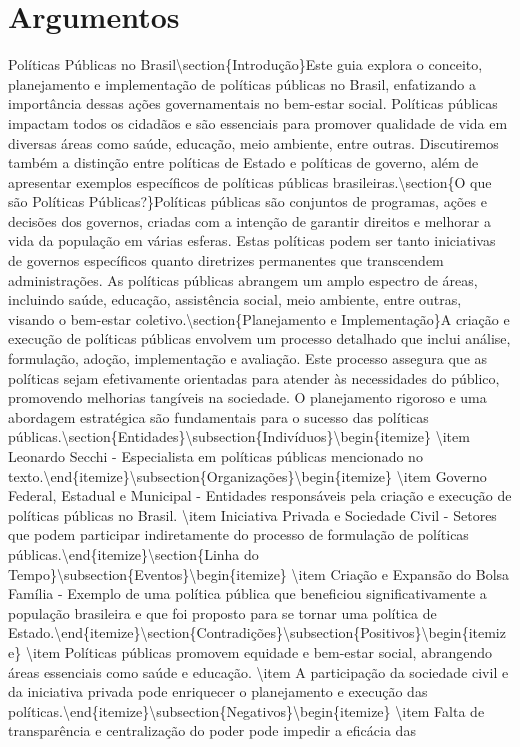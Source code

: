 \documentclass[
   article,       
   12pt,          
   oneside,       
   a4paper,       
   english,       
   brazil,        
   sumario=tradicional
   ]{abntex2}
\begin{document}
\section{Argumentos}
Políticas Públicas no Brasil\textbackslash{}section\{Introdução\}Este guia explora o conceito, planejamento e implementação de políticas públicas no Brasil, enfatizando a importância dessas ações governamentais no bem-estar social. Políticas públicas impactam todos os cidadãos e são essenciais para promover qualidade de vida em diversas áreas como saúde, educação, meio ambiente, entre outras. Discutiremos também a distinção entre políticas de Estado e políticas de governo, além de apresentar exemplos específicos de políticas públicas brasileiras.\textbackslash{}section\{O que são Políticas Públicas?\}Políticas públicas são conjuntos de programas, ações e decisões dos governos, criadas com a intenção de garantir direitos e melhorar a vida da população em várias esferas. Estas políticas podem ser tanto iniciativas de governos específicos quanto diretrizes permanentes que transcendem administrações. As políticas públicas abrangem um amplo espectro de áreas, incluindo saúde, educação, assistência social, meio ambiente, entre outras, visando o bem-estar coletivo.\textbackslash{}section\{Planejamento e Implementação\}A criação e execução de políticas públicas envolvem um processo detalhado que inclui análise, formulação, adoção, implementação e avaliação. Este processo assegura que as políticas sejam efetivamente orientadas para atender às necessidades do público, promovendo melhorias tangíveis na sociedade. O planejamento rigoroso e uma abordagem estratégica são fundamentais para o sucesso das políticas públicas.\textbackslash{}section\{Entidades\}\textbackslash{}subsection\{Indivíduos\}\textbackslash{}begin\{itemize\}    \textbackslash{}item Leonardo Secchi - Especialista em políticas públicas mencionado no texto.\textbackslash{}end\{itemize\}\textbackslash{}subsection\{Organizações\}\textbackslash{}begin\{itemize\}    \textbackslash{}item Governo Federal, Estadual e Municipal - Entidades responsáveis pela criação e execução de políticas públicas no Brasil.    \textbackslash{}item Iniciativa Privada e Sociedade Civil - Setores que podem participar indiretamente do processo de formulação de políticas públicas.\textbackslash{}end\{itemize\}\textbackslash{}section\{Linha do Tempo\}\textbackslash{}subsection\{Eventos\}\textbackslash{}begin\{itemize\}    \textbackslash{}item Criação e Expansão do Bolsa Família - Exemplo de uma política pública que beneficiou significativamente a população brasileira e que foi proposto para se tornar uma política de Estado.\textbackslash{}end\{itemize\}\textbackslash{}section\{Contradições\}\textbackslash{}subsection\{Positivos\}\textbackslash{}begin\{itemize\}    \textbackslash{}item Políticas públicas promovem equidade e bem-estar social, abrangendo áreas essenciais como saúde e educação.    \textbackslash{}item A participação da sociedade civil e da iniciativa privada pode enriquecer o planejamento e execução das políticas.\textbackslash{}end\{itemize\}\textbackslash{}subsection\{Negativos\}\textbackslash{}begin\{itemize\}    \textbackslash{}item Falta de transparência e centralização do poder pode impedir a eficácia das 
\end{document}
